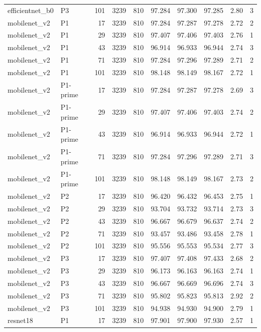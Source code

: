 \begin{longtable}{p{2.25cm}p{1.1cm}rrrrrrrr}
efficientnet\_b0 & P3 & 101 & 3239 & 810 & 97.284 & 97.300 & 97.285 & 2.80 & 3 \\ 
mobilenet\_v2 & P1 & 17 & 3239 & 810 & 97.284 & 97.287 & 97.278 & 2.72 & 2 \\ 
mobilenet\_v2 & P1 & 29 & 3239 & 810 & 97.407 & 97.406 & 97.403 & 2.76 & 1 \\ 
mobilenet\_v2 & P1 & 43 & 3239 & 810 & 96.914 & 96.933 & 96.944 & 2.74 & 3 \\ 
mobilenet\_v2 & P1 & 71 & 3239 & 810 & 97.284 & 97.296 & 97.289 & 2.71 & 2 \\ 
mobilenet\_v2 & P1 & 101 & 3239 & 810 & 98.148 & 98.149 & 98.167 & 2.72 & 1 \\ 
mobilenet\_v2 & P1-prime & 17 & 3239 & 810 & 97.284 & 97.287 & 97.278 & 2.69 & 3 \\ 
mobilenet\_v2 & P1-prime & 29 & 3239 & 810 & 97.407 & 97.406 & 97.403 & 2.74 & 2 \\ 
mobilenet\_v2 & P1-prime & 43 & 3239 & 810 & 96.914 & 96.933 & 96.944 & 2.72 & 1 \\ 
mobilenet\_v2 & P1-prime & 71 & 3239 & 810 & 97.284 & 97.296 & 97.289 & 2.71 & 3 \\ 
mobilenet\_v2 & P1-prime & 101 & 3239 & 810 & 98.148 & 98.149 & 98.167 & 2.73 & 2 \\ 
mobilenet\_v2 & P2 & 17 & 3239 & 810 & 96.420 & 96.432 & 96.453 & 2.75 & 1 \\ 
mobilenet\_v2 & P2 & 29 & 3239 & 810 & 93.704 & 93.732 & 93.714 & 2.73 & 3 \\ 
mobilenet\_v2 & P2 & 43 & 3239 & 810 & 96.667 & 96.679 & 96.637 & 2.74 & 2 \\ 
mobilenet\_v2 & P2 & 71 & 3239 & 810 & 93.457 & 93.486 & 93.458 & 2.78 & 1 \\ 
mobilenet\_v2 & P2 & 101 & 3239 & 810 & 95.556 & 95.553 & 95.534 & 2.77 & 3 \\ 
mobilenet\_v2 & P3 & 17 & 3239 & 810 & 97.407 & 97.408 & 97.433 & 2.68 & 2 \\ 
mobilenet\_v2 & P3 & 29 & 3239 & 810 & 96.173 & 96.163 & 96.163 & 2.74 & 1 \\ 
mobilenet\_v2 & P3 & 43 & 3239 & 810 & 96.667 & 96.669 & 96.696 & 2.74 & 3 \\ 
mobilenet\_v2 & P3 & 71 & 3239 & 810 & 95.802 & 95.823 & 95.813 & 2.92 & 2 \\ 
mobilenet\_v2 & P3 & 101 & 3239 & 810 & 94.938 & 94.930 & 94.900 & 2.79 & 1 \\ 
resnet18 & P1 & 17 & 3239 & 810 & 97.901 & 97.900 & 97.930 & 2.57 & 1 \\ 

\end{longtable}
